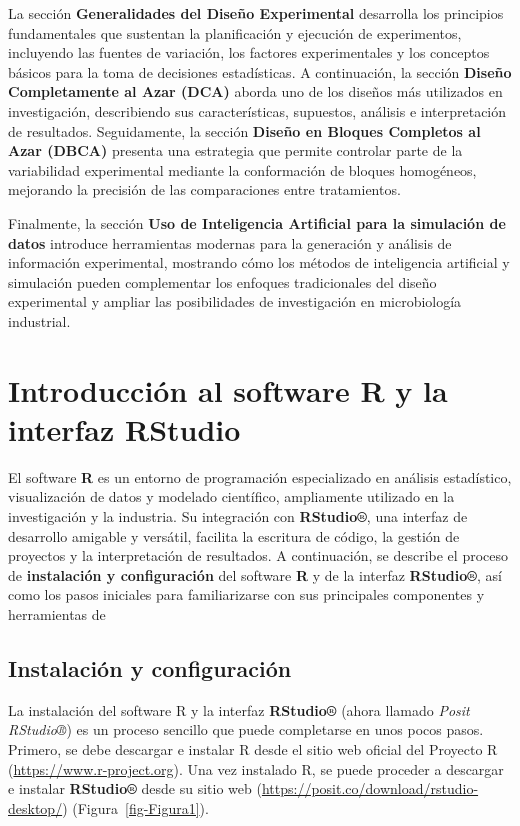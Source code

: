 \documentclass[
  spanish,
  letterpaper,
  DIV=11,
  numbers=noendperiod]{scrreprt}
\begin{document}
La sección \textbf{Generalidades del Diseño Experimental} desarrolla los
principios fundamentales que sustentan la planificación y ejecución de
experimentos, incluyendo las fuentes de variación, los factores
experimentales y los conceptos básicos para la toma de decisiones
estadísticas. A continuación, la sección \textbf{Diseño Completamente al
Azar (DCA)} aborda uno de los diseños más utilizados en investigación,
describiendo sus características, supuestos, análisis e interpretación
de resultados. Seguidamente, la sección \textbf{Diseño en Bloques
Completos al Azar (DBCA)} presenta una estrategia que permite controlar
parte de la variabilidad experimental mediante la conformación de
bloques homogéneos, mejorando la precisión de las comparaciones entre
tratamientos.

Finalmente, la sección \textbf{Uso de Inteligencia Artificial para la
simulación de datos} introduce herramientas modernas para la generación
y análisis de información experimental, mostrando cómo los métodos de
inteligencia artificial y simulación pueden complementar los enfoques
tradicionales del diseño experimental y ampliar las posibilidades de
investigación en microbiología industrial.


\chapter{Introducción al software R y la interfaz
RStudio}\label{introducciuxf3n-al-software-r-y-la-interfaz-rstudio}

El software \textbf{R} es un entorno de programación especializado en
análisis estadístico, visualización de datos y modelado científico,
ampliamente utilizado en la investigación y la industria. Su integración
con \textbf{RStudio®}, una interfaz de desarrollo amigable y versátil,
facilita la escritura de código, la gestión de proyectos y la
interpretación de resultados. A continuación, se describe el proceso de
\textbf{instalación y configuración} del software \textbf{R} y de la
interfaz \textbf{RStudio®}, así como los pasos iniciales para
familiarizarse con sus principales componentes y herramientas de

\section{Instalación y
configuración}\label{instalaciuxf3n-y-configuraciuxf3n}

La instalación del software R y la interfaz \textbf{RStudio®} (ahora
llamado \emph{Posit RStudio®}) es un proceso sencillo que puede
completarse en unos pocos pasos. Primero, se debe descargar e instalar R
desde el sitio web oficial del Proyecto R
(\hyperref[0]{https://www.r-project.org}). Una vez instalado R, se puede
proceder a descargar e instalar \textbf{RStudio®} desde su sitio web
(\hyperref[0]{https://posit.co/download/rstudio-desktop/})
(Figura~\ref{fig-Figura1}).
\end{document}
